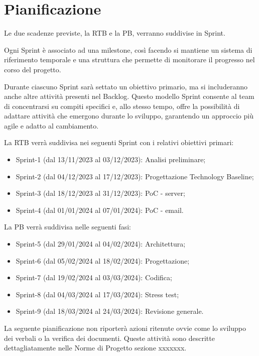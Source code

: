 \section{Pianificazione} \label{sec:pianificazione}

Le due scadenze previste, la RTB e la PB, verranno suddivise in Sprint. 

\noindent
Ogni Sprint è associato ad una milestone, così facendo si mantiene un sistema di riferimento temporale e una struttura che permette di monitorare il progresso nel corso del progetto.

\vspace{0.3cm}
\noindent
Durante ciascuno Sprint sarà settato un obiettivo primario, ma si includeranno anche altre attività presenti nel Backlog. Questo modello Sprint consente al team di concentrarsi su compiti specifici e, allo stesso tempo, offre la possibilità di adattare attività che emergono durante lo sviluppo, garantendo un approccio più agile e adatto al cambiamento.

\noindent
La RTB verrà suddivisa nei seguenti Sprint con i relativi obiettivi primari:
\begin{itemize}
    \item Sprint-1 (dal 13/11/2023 al 03/12/2023): Analisi preliminare;
    \item Sprint-2 (dal 04/12/2023 al 17/12/2023): Progettazione Technology Baseline;
    \item Sprint-3 (dal 18/12/2023 al 31/12/2023): PoC - server;
    \item Sprint-4 (dal 01/01/2024 al 07/01/2024): PoC - email.
\end{itemize}

\noindent
La PB verrà suddivisa nelle seguenti fasi:
    \begin{itemize}
    \item Sprint-5 (dal 29/01/2024 al 04/02/2024): Architettura;
    \item Sprint-6 (dal 05/02/2024 al 18/02/2024): Progettazione;
    \item Sprint-7 (dal 19/02/2024 al 03/03/2024): Codifica;
    \item Sprint-8 (dal 04/03/2024 al 17/03/2024): Stress test;
    \item Sprint-9 (dal 18/03/2024 al 24/03/2024): Revisione generale.
\end{itemize}

La seguente pianificazione non riporterà azioni ritenute ovvie come lo sviluppo dei verbali o la verifica dei documenti. Queste attività sono descritte dettagliatamente nelle Norme di Progetto sezione xxxxxxx. %



